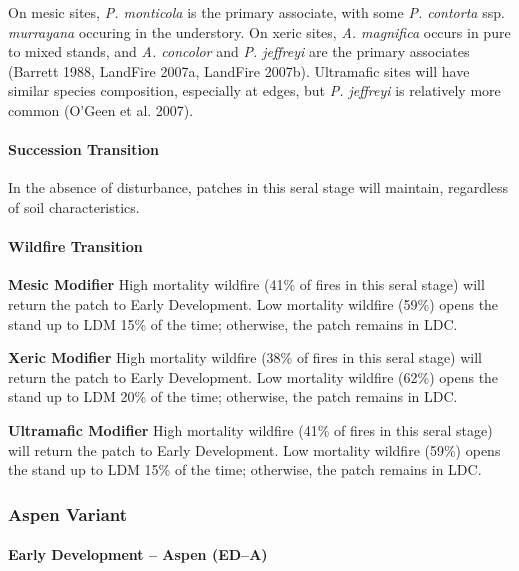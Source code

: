 On mesic sites, \emph{P. monticola} is the primary associate, with some \emph{P. contorta} ssp. \emph{murrayana} occuring in the understory. On xeric sites, \emph{A. magnifica} occurs in pure to mixed stands, and \emph{A. concolor} and \emph{P. jeffreyi} are the primary associates (Barrett 1988, LandFire 2007a, LandFire 2007b). Ultramafic sites will have similar species composition, especially at edges, but \emph{P. jeffreyi} is relatively more common (O'Geen et al. 2007).


\paragraph{Succession Transition} In the absence of disturbance, patches in this seral stage will maintain, regardless of soil characteristics.



\paragraph{Wildfire Transition}

\begin{adjustwidth}{2cm}{}
\noindent \textbf{Mesic Modifier } High mortality wildfire (41\% of fires in this seral stage) will return the patch to Early Development. Low mortality wildfire (59\%) opens the stand up to LDM 15\% of the time; otherwise, the patch remains in LDC. 

\medskip
\noindent \textbf{Xeric Modifier} High mortality wildfire (38\% of fires in this seral stage) will return the patch to Early Development. Low mortality wildfire (62\%) opens the stand up to LDM 20\% of the time; otherwise, the patch remains in LDC. 

\medskip
\noindent \textbf{Ultramafic Modifier} High mortality wildfire (41\% of fires in this seral stage) will return the patch to Early Development. Low mortality wildfire (59\%) opens the stand up to LDM 15\% of the time; otherwise, the patch remains in LDC.

\end{adjustwidth}

\noindent\hrulefill
\noindent\hrulefill

\subsubsection{Aspen Variant}

\paragraph{Early Development – Aspen (ED–A)}

